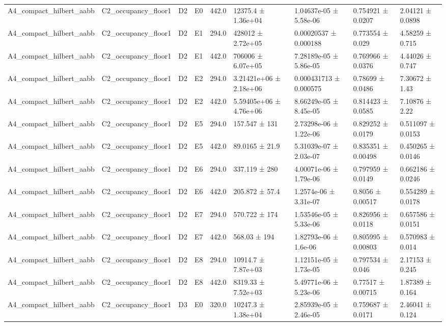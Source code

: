 \begin{table}
\begin{tabular}{lllllllll}
A4\_compact\_hilbert\_aabb & C2\_occupancy\_floor1 & D2 & E0 & 442.0 & 12375.4 ± 1.36e+04 & 1.04637e-05 ± 5.58e-06 & 0.754921 ± 0.0207 & 2.04121 ± 0.0898 \\
A4\_compact\_hilbert\_aabb & C2\_occupancy\_floor1 & D2 & E1 & 294.0 & 428012 ± 2.72e+05 & 0.00020537 ± 0.000188 & 0.773554 ± 0.029 & 4.58259 ± 0.715 \\
A4\_compact\_hilbert\_aabb & C2\_occupancy\_floor1 & D2 & E1 & 442.0 & 706006 ± 6.07e+05 & 7.28189e-05 ± 5.86e-05 & 0.769966 ± 0.0376 & 4.44026 ± 0.747 \\
A4\_compact\_hilbert\_aabb & C2\_occupancy\_floor1 & D2 & E2 & 294.0 & 3.21421e+06 ± 2.18e+06 & 0.000431713 ± 0.000575 & 0.78699 ± 0.0486 & 7.30672 ± 1.43 \\
A4\_compact\_hilbert\_aabb & C2\_occupancy\_floor1 & D2 & E2 & 442.0 & 5.59405e+06 ± 4.76e+06 & 8.66249e-05 ± 8.45e-05 & 0.814423 ± 0.0585 & 7.10876 ± 2.22 \\
A4\_compact\_hilbert\_aabb & C2\_occupancy\_floor1 & D2 & E5 & 294.0 & 157.547 ± 131 & 2.73298e-06 ± 1.22e-06 & 0.829252 ± 0.0179 & 0.511097 ± 0.0153 \\
A4\_compact\_hilbert\_aabb & C2\_occupancy\_floor1 & D2 & E5 & 442.0 & 89.0165 ± 21.9 & 5.31039e-07 ± 2.03e-07 & 0.835351 ± 0.00498 & 0.450265 ± 0.0146 \\
A4\_compact\_hilbert\_aabb & C2\_occupancy\_floor1 & D2 & E6 & 294.0 & 337.119 ± 280 & 4.00071e-06 ± 1.79e-06 & 0.797959 ± 0.0149 & 0.662186 ± 0.0246 \\
A4\_compact\_hilbert\_aabb & C2\_occupancy\_floor1 & D2 & E6 & 442.0 & 205.872 ± 57.4 & 1.2574e-06 ± 3.31e-07 & 0.8056 ± 0.00517 & 0.554289 ± 0.0178 \\
A4\_compact\_hilbert\_aabb & C2\_occupancy\_floor1 & D2 & E7 & 294.0 & 570.722 ± 174 & 1.53546e-05 ± 5.33e-06 & 0.826956 ± 0.0118 & 0.657586 ± 0.0151 \\
A4\_compact\_hilbert\_aabb & C2\_occupancy\_floor1 & D2 & E7 & 442.0 & 568.03 ± 194 & 1.82793e-06 ± 1.6e-06 & 0.805995 ± 0.00803 & 0.570983 ± 0.014 \\
A4\_compact\_hilbert\_aabb & C2\_occupancy\_floor1 & D2 & E8 & 294.0 & 10914.7 ± 7.87e+03 & 1.12151e-05 ± 1.73e-05 & 0.797534 ± 0.046 & 2.17153 ± 0.245 \\
A4\_compact\_hilbert\_aabb & C2\_occupancy\_floor1 & D2 & E8 & 442.0 & 8319.33 ± 7.52e+03 & 5.49771e-06 ± 5.23e-06 & 0.77517 ± 0.00715 & 1.87389 ± 0.164 \\
A4\_compact\_hilbert\_aabb & C2\_occupancy\_floor1 & D3 & E0 & 320.0 & 10247.3 ± 1.38e+04 & 2.85939e-05 ± 2.46e-05 & 0.759687 ± 0.0171 & 2.46041 ± 0.124 \\

\end{tabular}
\end{table}
